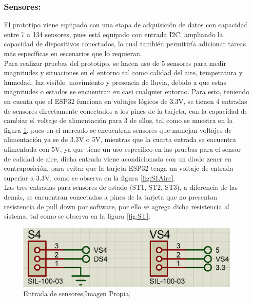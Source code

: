 	\subsubsection{Sensores:}
		El prototipo viene equipado con una etapa de adquisición de datos con capacidad entre 7 a 134 sensores, pues está equipado con entrada I2C, ampliando la capacidad de dispositivos conectados, lo cual también permitiría adicionar tareas más específicas en escenarios que lo requieran.\\
		
		Para realizar pruebas del prototipo, se hacen uso de 5 sensores para medir magnitudes y situaciones en el entorno tal como calidad del aire, temperatura y humedad, luz visible, movimiento y presencia de lluvia, debido a que estas magnitudes o estados se encuentran en casi cualquier entorno. Para esto, teniendo en cuenta que el ESP32 funciona en voltajes lógicos de 3.3V, se tienen 4 entradas de sensores directamente conectados a los pines de la tarjeta, con la capacidad de cambiar el voltaje de alimentación para 3 de ellos, tal como se muestra en la figura \ref{fig:SVS}, pues en el mercado se encuentran sensores que manejan voltajes de alimentación ya se de 3.3V o 5V, mientras que la cuarta entrada se encuentra alimentada con 5V, ya que tiene un uso específico en las pruebas para el sensor de calidad de aire, dicha entrada viene acondicionada con un diodo zener en contraposición, para evitar que la tarjeta ESP32 tenga un voltaje de entrada superior a 3.3V, como se observa en la figura \ref{fig:S1Aire}.\\
		
		Las tres entradas para sensores de estado (ST1, ST2, ST3), a diferencia de las demás, se encuentran conectadas a pines de la tarjeta que no presentan resistencia de pull down por software, por ello se agrega dicha resistencia al sistema, tal como se observa en la figura \ref{fig:ST}.\\
		
		\begin{figure}[H]
			\centering
			\caption{Entrada de sensores[Imagen Propia]}
			\label{fig:SVS}
			\includegraphics[width=0.7\linewidth]{Imagenes/SVS}
		\end{figure}
	
